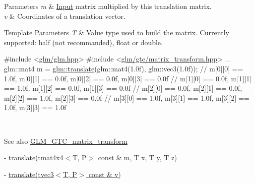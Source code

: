 \begin{DoxyParams}{Parameters}
{\em m} & \hyperlink{class_input}{Input} matrix multiplied by this translation matrix. \\
\hline
{\em v} & Coordinates of a translation vector. \\
\hline
\end{DoxyParams}

\begin{DoxyTemplParams}{Template Parameters}
{\em T} & Value type used to build the matrix. Currently supported\+: half (not recommanded), float or double. 
\begin{DoxyCode}
\textcolor{preprocessor}{#include <\hyperlink{glm_8hpp}{glm/glm.hpp}>}
\textcolor{preprocessor}{#include <\hyperlink{matrix__transform_8hpp}{glm/gtc/matrix\_transform.hpp}>}
...
glm::mat4 m = \hyperlink{group__gtc__matrix__transform_gaee134ab77c6c5548a6ebf4e8e476c6ed}{glm::translate}(glm::mat4(1.0f), glm::vec3(1.0f));
\textcolor{comment}{// m[0][0] == 1.0f, m[0][1] == 0.0f, m[0][2] == 0.0f, m[0][3] == 0.0f}
\textcolor{comment}{// m[1][0] == 0.0f, m[1][1] == 1.0f, m[1][2] == 0.0f, m[1][3] == 0.0f}
\textcolor{comment}{// m[2][0] == 0.0f, m[2][1] == 0.0f, m[2][2] == 1.0f, m[2][3] == 0.0f}
\textcolor{comment}{// m[3][0] == 1.0f, m[3][1] == 1.0f, m[3][2] == 1.0f, m[3][3] == 1.0f}
\end{DoxyCode}
 \\
\hline
\end{DoxyTemplParams}
\begin{DoxySeeAlso}{See also}
\hyperlink{group__gtc__matrix__transform}{G\+L\+M\+\_\+\+G\+T\+C\+\_\+matrix\+\_\+transform} 

-\/ translate(tmat4x4$<$\+T, P$>$ const \& m, T x, T y, T z) 

-\/ \hyperlink{group__gtx__transform_ga838c4505ef7f254ed05117b1ac9691fb}{translate(tvec3$<$\+T, P$>$ const \& v)} 
\end{DoxySeeAlso}
\hypertarget{group__gtc__matrix__transform_gaed64bd81f5ecdab52fecbdf7f6b58194}{}
